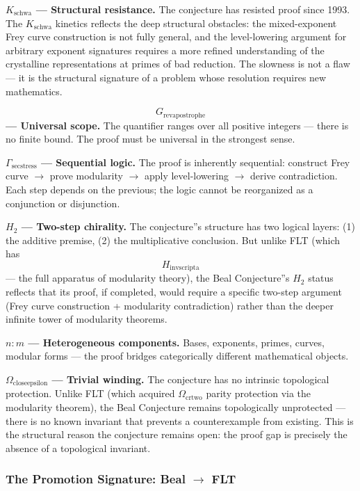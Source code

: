 \documentclass[12pt,a4paper]{article}
\begin{document}
\textbf{$K_{\text{schwa}}$ --- Structural resistance.} The conjecture has resisted proof since 1993. The $K_{\text{schwa}}$ kinetics reflects the deep structural obstacles: the mixed-exponent Frey curve construction is not fully general, and the level-lowering argument for arbitrary exponent signatures requires a more refined understanding of the crystalline representations at primes of bad reduction. The slowness is not a flaw --- it is the structural signature of a problem whose resolution requires new mathematics.

\textbf{$$G_{\text{revapostrophe}}$$ --- Universal scope.} The quantifier ranges over all positive integers --- there is no finite bound. The proof must be universal in the strongest sense.

\textbf{$\Gamma_{\text{secstress}}$ --- Sequential logic.} The proof is inherently sequential: construct Frey curve $\rightarrow$ prove modularity $\rightarrow$ apply level-lowering $\rightarrow$ derive contradiction. Each step depends on the previous; the logic cannot be reorganized as a conjunction or disjunction.

\textbf{$H_2$ --- Two-step chirality.} The conjecture''s structure has two logical layers: (1) the additive premise, (2) the multiplicative conclusion. But unlike FLT (which has $$H_{\text{invscripta}}$$ --- the full apparatus of modularity theory), the Beal Conjecture''s $H_2$ status reflects that its proof, if completed, would require a specific two-step argument (Frey curve construction + modularity contradiction) rather than the deeper infinite tower of modularity theorems.

\textbf{$n{:}m$ --- Heterogeneous components.} Bases, exponents, primes, curves, modular forms --- the proof bridges categorically different mathematical objects.

\textbf{$\Omega_{\text{closeepsilon}}$ --- Trivial winding.} The conjecture has no intrinsic topological protection. Unlike FLT (which acquired $\Omega_{\text{crtwo}}$ parity protection via the modularity theorem), the Beal Conjecture remains topologically unprotected --- there is no known invariant that prevents a counterexample from existing. This is the structural reason the conjecture remains open: the proof gap is precisely the absence of a topological invariant.

\subsubsection{The Promotion Signature: Beal $\rightarrow$ FLT}
\end{document}
